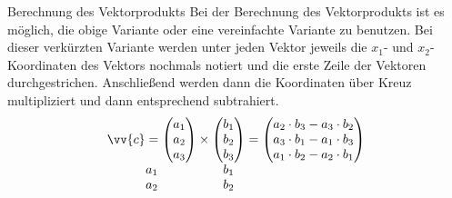\begin{b8d*}{Berechnung des Vektorprodukts}{}
    Bei der Berechnung des Vektorprodukts ist es möglich, die obige Variante oder eine vereinfachte Variante zu benutzen. Bei dieser verkürzten Variante werden unter jeden Vektor jeweils die $x_1$- und $x_2$-Koordinaten des Vektors nochmals notiert und die erste Zeile der Vektoren durchgestrichen. Anschließend werden dann die Koordinaten über Kreuz multipliziert und dann entsprechend subtrahiert.
\[
\begin{array}[t]{@{}c@{}}
\vv{c}=\begin{pmatrix} a_1 \\ a_2 \\ a_3 \end{pmatrix} \\ a_1 \\ a_2
\end{array}
\times
\begin{array}[t]{@{}c@{}}
\begin{pmatrix} b_1 \\ b_2 \\ b_3 \end{pmatrix} \\ b_1 \\ b_2
\end{array}
=
\begin{pmatrix}
a_2\cdot b_3-a_3\cdot b_2 \\
a_3\cdot b_1-a_1\cdot b_3 \\
a_1\cdot b_2-a_2\cdot b_1
\end{pmatrix}
\] 
\begin{center}
\end{center}
\end{b8d*}
